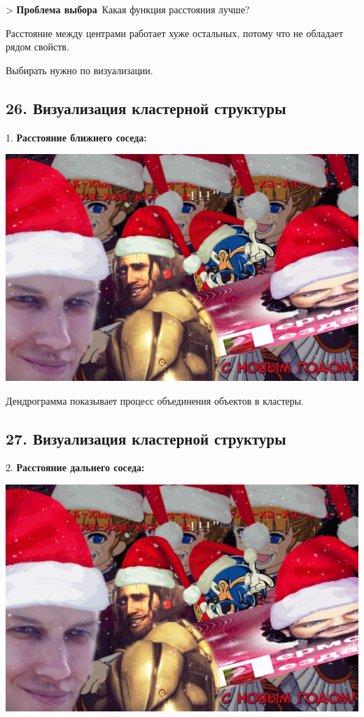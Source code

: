 > \textbf{Проблема выбора}\
Какая функция расстояния лучше?

Расстояние между центрами работает хуже остальных, потому что не обладает
рядом свойств.

Выбирать нужно по визуализации.

\subsection{26. Визуализация кластерной структуры}

1. \textbf{Расстояние ближнего соседа:}

\includegraphics[scale=0.3]{figures/samplefigure.jpg}

Дендрограмма показывает процесс объединения объектов в кластеры.

\subsection{27. Визуализация кластерной структуры}

2. \textbf{Расстояние дальнего соседа:}

\includegraphics[scale=0.3]{figures/samplefigure.jpg}

